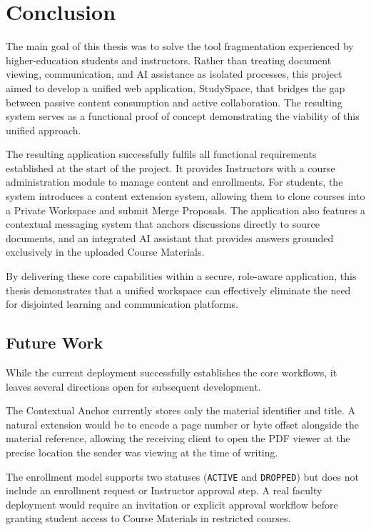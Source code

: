 \chapter{Conclusion}
\label{ch:conclusion}

The main goal of this thesis was to solve the tool fragmentation experienced by higher-education students and instructors. Rather than treating document viewing, communication, and AI assistance as isolated processes, this project aimed to develop a unified web application, StudySpace, that bridges the gap between passive content consumption and active collaboration. The resulting system serves as a functional proof of concept demonstrating the viability of this unified approach.

The resulting application successfully fulfils all functional requirements established at the start of the project. It provides Instructors with a course administration module to manage content and enrollments. For students, the system introduces a content extension system, allowing them to clone courses into a Private Workspace and submit Merge Proposals. The application also features a contextual messaging system that anchors discussions directly to source documents, and an integrated AI assistant that provides answers grounded exclusively in the uploaded Course Materials. 

By delivering these core capabilities within a secure, role-aware application, this thesis demonstrates that a unified workspace can effectively eliminate the need for disjointed learning and communication platforms.
\section{Future Work}
\label{sec:future-work}

While the current deployment successfully establishes the core workflows, it leaves several directions open for subsequent development.

The Contextual Anchor currently stores only the material identifier and title. A natural
extension would be to encode a page number or byte offset alongside the material reference,
allowing the receiving client to open the PDF viewer at the precise location the sender was
viewing at the time of writing.

The enrollment model supports two statuses (\texttt{ACTIVE} and \texttt{DROPPED}) but does not
include an enrollment request or Instructor approval step. A real faculty deployment would
require an invitation or explicit approval workflow before granting student access to Course
Materials in restricted courses.

